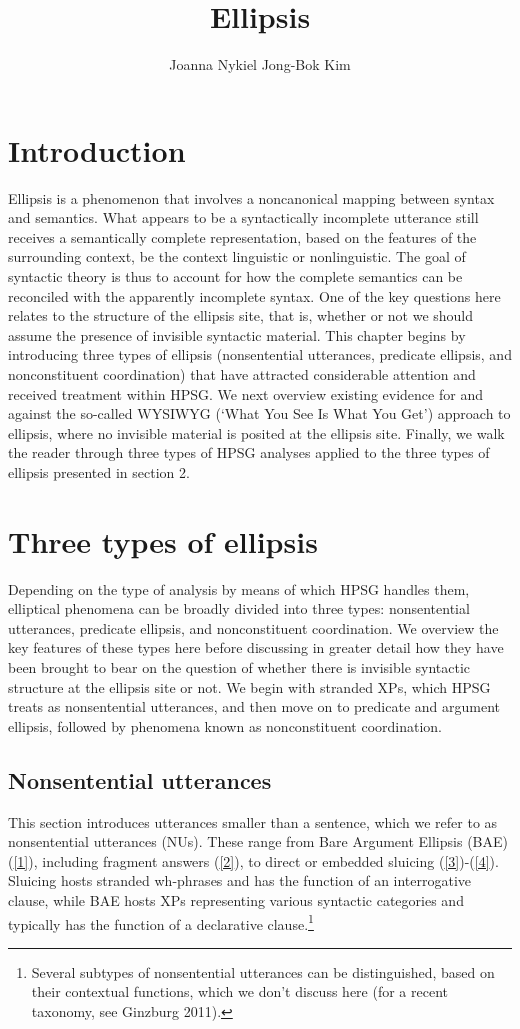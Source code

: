 \documentclass[output=paper]{langsci/langscibook}
\author{%
	Joanna Nykiel\affiliation{Kyung Hee University}%
	\lastand Jong-Bok Kim\affiliation{Kyung Hee University, Seoul}%
}
\title{Ellipsis}
\begin{document}
\label{chap-ellipsis}

{

\section{Introduction}
         Ellipsis is a phenomenon that involves a noncanonical mapping between syntax and semantics. What appears to be a syntactically incomplete utterance still receives a semantically complete representation, based on the features of the surrounding context, be the context linguistic or nonlinguistic. The goal of syntactic theory is thus to account for how the complete semantics can be reconciled with the apparently incomplete syntax. One of the key questions here relates to the structure of the ellipsis site, that is, whether or not we should assume the presence of invisible syntactic material. This chapter begins by introducing three types of ellipsis (nonsentential utterances, predicate ellipsis, and nonconstituent coordination) that have attracted considerable attention and received treatment within HPSG. We next overview existing evidence for and against the so-called WYSIWYG (`What You See Is What You Get') approach to ellipsis, where no invisible material is posited at the ellipsis site. Finally, we walk the reader through three types of HPSG analyses applied to the three types of ellipsis presented in section 2.


\section{Three types of ellipsis}
         Depending on the type of analysis by means of which HPSG handles them, elliptical phenomena can be broadly divided into three types:
         nonsentential utterances, predicate ellipsis, and nonconstituent coordination.
          We overview the key features of these types here before discussing in greater detail how they have been brought to bear on the question of whether there is invisible syntactic structure at the ellipsis site or not. We begin with stranded XPs, which HPSG treats as nonsentential utterances, and then move on to predicate and argument ellipsis, followed by phenomena known as nonconstituent coordination.

\subsection{Nonsentential utterances}
This section introduces utterances smaller than a sentence, which we refer to as nonsentential utterances (NUs). These range from Bare Argument Ellipsis (BAE) (\ref{1}), including fragment answers (\ref{2}), to direct or embedded sluicing (\ref{3})-(\ref{4}). Sluicing hosts stranded wh-phrases and has the function of an interrogative clause, while BAE hosts XPs representing various syntactic categories and typically has the function of a declarative clause.\footnote{Several subtypes of nonsentential utterances can be distinguished, based on their contextual functions, which we don't discuss here (for a recent taxonomy, see Ginzburg 2011).}



}
\end{document}

